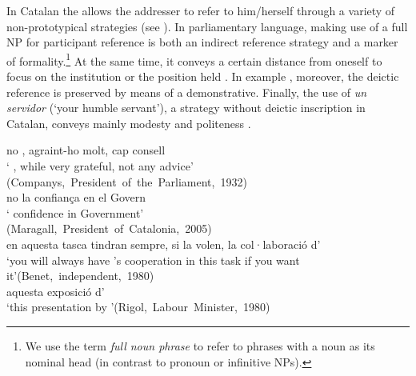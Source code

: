 \documentclass[output=paper]{langscibook}
\begin{document}
\label{sec:nogue:2.1.1.2}




In Catalan the  allows the addresser to refer to him/herself through a variety of non-prototypical strategies (see \cites[124–127]{Nogué2011}[226–228]{Nogué2015}). In parliamentary language, making use of a full NP for participant reference is both an indirect reference strategy and a marker of formality.\footnote{We use the term \textit{full noun phrase} to refer to phrases with a noun as its nominal head (in contrast to pronoun or infinitive NPs).} At the same time, it conveys a certain distance from oneself to focus on the institution  or the position held . In example , moreover, the deictic reference is preserved by means of a demonstrative. Finally, the use of \textit{un servidor} (‘your humble servant’), a  strategy without deictic inscription in Catalan, conveys mainly modesty and politeness .



\ea\label{ex:nogue:5}
 {no} , agraint-ho molt, cap consell\\


\glt ` , while very grateful,  not  any advice'\\
\hfill\hbox{(Companys, President of the Parliament, 1932)}\\
\ex\label{ex:nogue:6}
{{ {no}  {la confiança en el}  {Govern}}}\\
\glt `     confidence in  Government'\\
\hfill\hbox{(Maragall, President of Catalonia, 2005)}\\
\ex\label{ex:nogue:7}
{en aquesta tasca tindran sempre, si la volen, la col·laboració d’}\\
\glt `you will always have    ’s cooperation in this task if you want it'\hfill\hbox{(Benet, independent, 1980)}\\
\ex\label{ex:nogue:8}
{aquesta exposició d’}\\
\glt `this presentation by   '\hfill\hbox{(Rigol, Labour Minister, 1980)}\\
\z 
\end{document}

